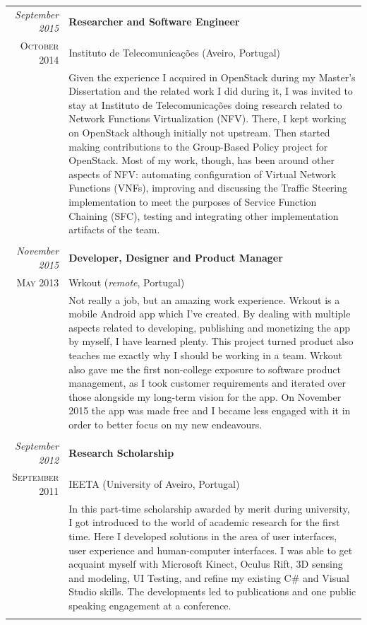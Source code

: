 \documentclass[letter,10pt]{article} %
\begin{document}
\begin{tabular}{r|p{13.4cm}}
	\emph{September 2015} & \textbf{Researcher and Software Engineer} \\
	\textsc{October 2014} & Instituto de Telecomunicações (Aveiro, Portugal) \\
    & \scriptsize{Given the experience I acquired in OpenStack during my Master's Dissertation and the related work I did during it, I was invited to stay at Instituto de Telecomunicações doing research related to Network Functions Virtualization (NFV). There, I kept working on OpenStack although initially not upstream. Then started making contributions to the Group-Based Policy project for OpenStack. Most of my work, though, has been around other aspects of NFV: automating configuration of Virtual Network Functions (VNFs), improving and discussing the Traffic Steering implementation to meet the purposes of Service Function Chaining (SFC), testing and integrating other implementation artifacts of the team. }\\
	\multicolumn{2}{c}{} \\

	\emph{November 2015} & \textbf{Developer, Designer and Product Manager} \\
	\textsc{May 2013} & Wrkout (\textit{remote}, Portugal) \\
	& \scriptsize{Not really a job, but an amazing work experience. Wrkout is a mobile Android app which I've created. By dealing with multiple aspects related to developing, publishing and monetizing the app by myself, I have learned plenty. This project turned product also teaches me exactly why I should be working in a team. Wrkout also gave me the first non-college exposure to software product management, as I took customer requirements and iterated over those alongside my long-term vision for the app. On November 2015 the app was made free and I became less engaged with it in order to better focus on my new endeavours.}\\
	\multicolumn{2}{c}{}\\
	
	\emph{September 2012} & \textbf{Research Scholarship} \\
	\textsc{September 2011} &IEETA (University of Aveiro, Portugal) \\
	& \scriptsize{In this part-time scholarship awarded by merit during university, I got introduced to the world of academic research for the first time. Here I developed solutions in the area of user interfaces, user experience and human-computer interfaces. I was able to get acquaint myself with Microsoft Kinect, Oculus Rift, 3D sensing and modeling, UI Testing, and refine my existing C\# and Visual Studio skills. The developments led to publications and one public speaking engagement at a conference.}\\
	\multicolumn{2}{c}{}\\

\end{tabular}
\end{document}
